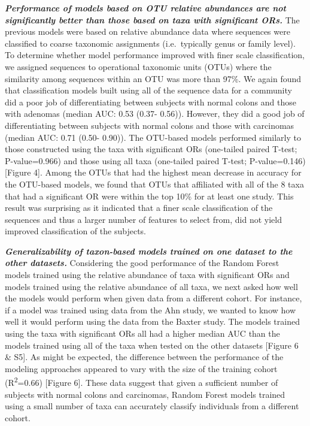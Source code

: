 \documentclass[12pt,]{article}
\begin{document}
\textbf{\emph{Performance of models based on OTU relative abundances are
not significantly better than those based on taxa with significant
ORs.}} The previous models were based on relative abundance data where
sequences were classified to coarse taxonomic assignments
(i.e.~typically genus or family level). To determine whether model
performance improved with finer scale classification, we assigned
sequences to operational taxonomic units (OTUs) where the similarity
among sequences within an OTU was more than 97\%. We again found that
classification models built using all of the sequence data for a
community did a poor job of differentiating between subjects with normal
colons and those with adenomas (median AUC: 0.53 (0.37- 0.56)). However,
they did a good job of differentiating between subjects with normal
colons and those with carcinomas (median AUC: 0.71 (0.50- 0.90)). The
OTU-based models performed similarly to those constructed using the taxa
with significant ORs (one-tailed paired T-test; P-value=0.966) and those
using all taxa (one-tailed paired T-test; P-value=0.146) {[}Figure 4{]}.
Among the OTUs that had the highest mean decrease in accuracy for the
OTU-based models, we found that OTUs that affiliated with all of the 8
taxa that had a significant OR were within the top 10\% for at least one
study. This result was surprising as it indicated that a finer scale
classification of the sequences and thus a larger number of features to
select from, did not yield improved classification of the subjects.

\textbf{\emph{Generalizability of taxon-based models trained on one
dataset to the other datasets.}} Considering the good performance of the
Random Forest models trained using the relative abundance of taxa with
significant ORs and models trained using the relative abundance of all
taxa, we next asked how well the models would perform when given data
from a different cohort. For instance, if a model was trained using data
from the Ahn study, we wanted to know how well it would perform using
the data from the Baxter study. The models trained using the taxa with
significant ORs all had a higher median AUC than the models trained
using all of the taxa when tested on the other datasets {[}Figure 6 \&
S5{]}. As might be expected, the difference between the performance of
the modeling approaches appeared to vary with the size of the training
cohort (R\textsuperscript{2}=0.66) {[}Figure 6{]}. These data suggest
that given a sufficient number of subjects with normal colons and
carcinomas, Random Forest models trained using a small number of taxa
can accurately classify individuals from a different cohort.
\end{document}
